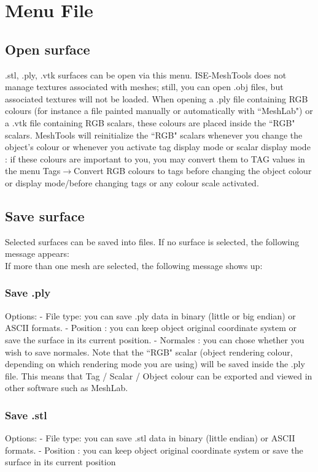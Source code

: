 \chapter{Menu File}
\minitoc  

\section{Open surface}
.stl, .ply, .vtk surfaces can be open via this menu. ISE-MeshTools does not manage textures associated with meshes; still, you can open .obj files, but associated textures will not be loaded. When opening a .ply file containing RGB colours (for instance a file painted manually or automatically with ``MeshLab") or a .vtk file containing RGB scalars, these colours are placed inside the ``RGB" scalars. MeshTools will reinitialize the ``RGB" scalars whenever you change the object’s colour or whenever you activate tag display mode or scalar display mode : if these colours are important to you, you may convert them to TAG values in the menu Tags$\rightarrow$Convert RGB colours to tags before changing the object colour or display mode/before changing tags or any colour scale activated.

\section{Save surface}
Selected surfaces can be saved into files. If no surface is selected, the following message appears:\\
If more than one mesh are selected, the following message shows up:\\

\subsection{Save .ply}
Options:
- File type: you can save .ply data in binary (little or big endian)
or ASCII formats.
- Position : you can keep object original coordinate system or
save the surface in its current position.
- Normales : you can chose whether you wish to save normales.
Note that the ``RGB" scalar (object rendering colour, depending on which rendering mode you
are using) will be saved inside the .ply file. This means that Tag / Scalar / Object colour can be exported
and viewed in other software such as MeshLab.


\subsection{Save .stl}
Options:
- File type: you can save .stl data in binary (little endian) or
ASCII formats.
- Position : you can keep object original coordinate system or save the surface in its current position

